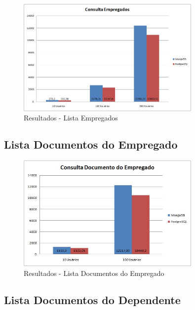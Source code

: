 \begin{figure}[!htbp]
	\begin{center}
		\includegraphics[width=0.8\textwidth]{resultados/consulta_empregados}
	\end{center}
	\caption{Resultados - Lista Empregados}
	\label{fig:resultlistaempregados}
\end{figure}

\subsection{Lista Documentos do Empregado}

\begin{figure}[!htbp]
	\begin{center}
		\includegraphics[width=0.8\textwidth]{resultados/consulta_doc_empregado}
	\end{center}
	\caption{Resultados - Lista Documentos do Empregado}
	\label{fig:resultlistadocempregado}
\end{figure}

\subsection{Lista Documentos do Dependente}

